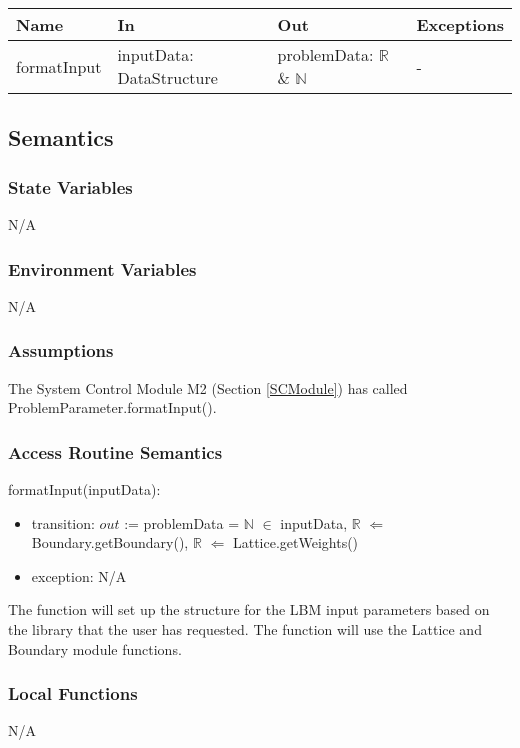 \documentclass[12pt, titlepage]{article}
\begin{document}
\begin{center}
	\begin{tabular}{p{2cm} p{3cm} p{4cm} p{2cm}}
		\hline
		\textbf{Name} & \textbf{In} & \textbf{Out} & \textbf{Exceptions} \\
		\hline
		formatInput & inputData: DataStructure & problemData: $\mathbb{R}$ \& $\mathbb{N}$ & - \\
		\hline
	\end{tabular}
\end{center}

\subsection{Semantics}

\subsubsection{State Variables}
N/A

\subsubsection{Environment Variables}
N/A

\subsubsection{Assumptions}

The System Control Module M2 (Section \ref{SCModule}) has called ProblemParameter.formatInput().

\subsubsection{Access Routine Semantics}

\noindent formatInput(inputData):
\begin{itemize}
	\item transition: $out$ := problemData = $\mathbb{N}$ $\in$ inputData, $\mathbb{R}$ $\Leftarrow$ Boundary.getBoundary(), $\mathbb{R}$ $\Leftarrow$ Lattice.getWeights()
	\item exception: N/A
\end{itemize}

The function will set up the structure for the LBM input parameters based on the library that the user has requested. The function will use the Lattice and Boundary module functions.

\subsubsection{Local Functions}
N/A
\end{document}
